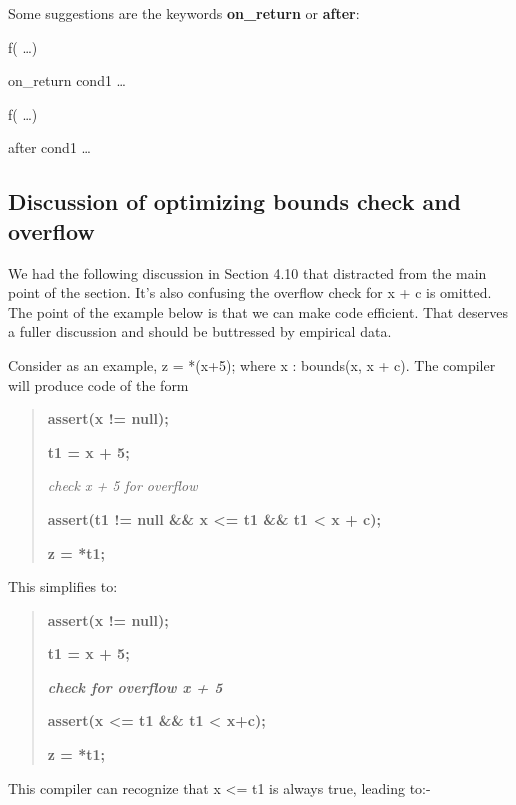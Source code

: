 \documentclass[]{article}
\begin{document}
Some suggestions are the keywords \textbf{on\_return} or \textbf{after}:

f( \ldots{})

on\_return cond1 \ldots{}

f( \ldots{})

after cond1 \ldots{}

\subsection{\texorpdfstring{\protect\hypertarget{ux5fToc426641138}{}{\protect\hypertarget{ux5fToc435435013}{}{\protect\hypertarget{ux5fToc437460847}{}{\protect\hypertarget{ux5fToc440445528}{}{\protect\hypertarget{ux5fToc440449310}{}{\protect\hypertarget{ux5fToc440551960}{}{}}}}}}Discussion
of optimizing bounds check and
overflow}{Discussion of optimizing bounds check and overflow}}\label{discussion-of-optimizing-bounds-check-and-overflow}

We had the following discussion in Section 4.10 that distracted from the
main point of the section. It's also confusing the overflow check for x
+ c is omitted. The point of the example below is that we can make code
efficient. That deserves a fuller discussion and should be buttressed by
empirical data.

Consider as an example, z = *(x+5); where x : bounds(x, x + c). The
compiler will produce code of the form

\begin{quote}
\textbf{assert(x != null);}

\textbf{t1 = x + 5;}

\emph{check x + 5 for overflow}

\textbf{assert(t1 != null \&\& x \textless{}= t1 \&\& t1 \textless{} x +
c);}

\textbf{z = *t1;}
\end{quote}

This simplifies to:

\begin{quote}
\textbf{assert(x != null);}

\textbf{t1 = x + 5;}

\emph{\textbf{check for overflow x + 5}}

\textbf{assert(x \textless{}= t1 \&\& t1 \textless{} x+c);}

\textbf{z = *t1;}
\end{quote}

This compiler can recognize that x \textless{}= t1 is always true,
leading to:-
\end{document}

